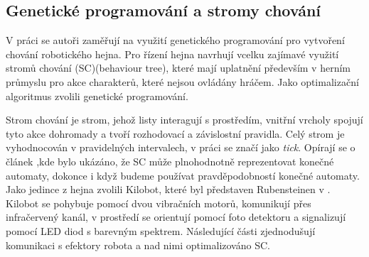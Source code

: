\subsection{Genetické programování a stromy chování}
V práci  \citep{Jones2018} se autoři zaměřují na využití genetického programování pro vytvoření chování robotického hejna. Pro řízení hejna navrhují vcelku zajímavé využití stromů chování (SC)(behaviour tree), které mají uplatnění především v herním průmyslu pro akce charakterů, které nejsou ovládány hráčem. Jako optimalizační algoritmus zvolili genetické programování. 
\par
Strom chování je strom, jehož listy interagují s prostředím, vnitřní vrcholy spojují tyto akce dohromady a tvoří rozhodovací a závislostní pravidla. Celý strom je vyhodnocován v pravidelných intervalech, v práci se značí jako \textit{tick}. Opírají se o článek \citep{shoulson2011parameterizing},kde bylo ukázáno, že SC může plnohodnotně reprezentovat konečné automaty, dokonce i když budeme používat pravděpodobností konečné automaty. Jako jedince z hejna zvolili Kilobot, které byl představen Rubensteinen v \citep{Kilobots}. Kilobot se pohybuje pomocí dvou vibračních motorů, komunikují přes infračervený kanál, v prostředí se orientují pomocí foto detektoru a signalizují pomocí LED diod s barevným spektrem. Následující části zjednodušují komunikaci s efektory robota a nad nimi optimalizováno SC. 
\par
\begin{table}[h]
	\caption{Parameterizing behavior trees, Motion in Games - podoba stromů}
\end{table}
